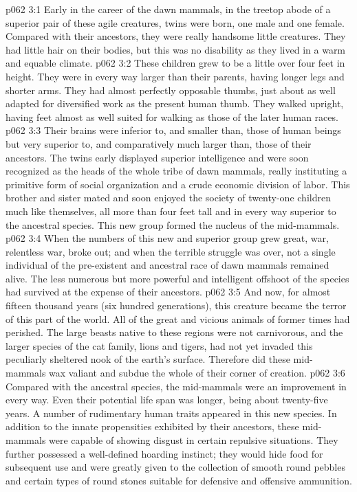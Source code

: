 \vs p062 3:1 Early in the career of the dawn mammals, in the treetop abode of a superior pair of these agile creatures, twins were born, one male and one female. Compared with their ancestors, they were really handsome little creatures. They had little hair on their bodies, but this was no disability as they lived in a warm and equable climate.\plusone
\vs p062 3:2 These children grew to be a little over four feet in height. They were in every way larger than their parents, having longer legs and shorter arms. They had almost perfectly opposable thumbs, just about as well adapted for diversified work as the present human thumb. They walked upright, having feet almost as well suited for walking as those of the later human races.
\vs p062 3:3 Their brains were inferior to, and smaller than, those of human beings but very superior to, and comparatively much larger than, those of their ancestors. The twins early displayed superior intelligence and were soon recognized as the heads of the whole tribe of dawn mammals, really instituting a primitive form of social organization and a crude economic division of labor. This brother and sister mated and soon enjoyed the society of twenty\hyp{}one children much like themselves, all more than four feet tall and in every way superior to the ancestral species. This new group formed the nucleus of the mid\hyp{}mammals.
\vs p062 3:4 When the numbers of this new and superior group grew great, war, relentless war, broke out; and when the terrible struggle was over, not a single individual of the pre\hyp{}existent and ancestral race of dawn mammals remained alive. The less numerous but more powerful and intelligent offshoot of the species had survived at the expense of their ancestors.
\vs p062 3:5 And now, for almost fifteen thousand years (six hundred generations), this creature became the terror of this part of the world. All of the great and vicious animals of former times had perished. The large beasts native to these regions were not carnivorous, and the larger species of the cat family, lions and tigers, had not yet invaded this peculiarly sheltered nook of the earth’s surface. Therefore did these mid\hyp{}mammals wax valiant and subdue the whole of their corner of creation.
\pc \vs p062 3:6 Compared with the ancestral species, the mid\hyp{}mammals were an improvement in every way. Even their potential life span was longer, being about twenty\hyp{}five years. A number of rudimentary human traits appeared in this new species. In addition to the innate propensities exhibited by their ancestors, these mid\hyp{}mammals were capable of showing disgust in certain repulsive situations. They further possessed a well\hyp{}defined hoarding instinct; they would hide food for subsequent use and were greatly given to the collection of smooth round pebbles and certain types of round stones suitable for defensive and offensive ammunition.
